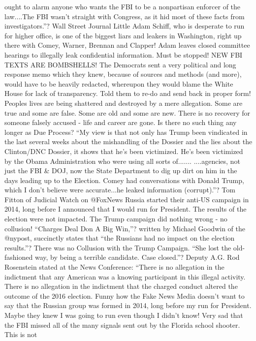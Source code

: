 ought to alarm anyone who wants the FBI to be a nonpartisan enforcer of
the law....The FBI wasn't straight with Congress, as it hid most of
these facts from investigators.''? Wall Street Journal Little Adam
Schiff, who is desperate to run for higher office, is one of the biggest
liars and leakers in Washington, right up there with Comey, Warner,
Brennan and Clapper! Adam leaves closed committee hearings to illegally
leak confidential information. Must be stopped! NEW FBI TEXTS ARE
BOMBSHELLS! The Democrats sent a very political and long response memo
which they knew, because of sources and methods (and more), would have
to be heavily redacted, whereupon they would blame the White House for
lack of transparency. Told them to re-do and send back in proper form!
Peoples lives are being shattered and destroyed by a mere allegation.
Some are true and some are false. Some are old and some are new. There
is no recovery for someone falsely accused - life and career are gone.
Is there no such thing any longer as Due Process? ``My view is that not
only has Trump been vindicated in the last several weeks about the
mishandling of the Dossier and the lies about the Clinton/DNC Dossier,
it shows that he's been victimized. He's been victimized by the Obama
Administration who were using all sorts of....... ....agencies, not just
the FBI \& DOJ, now the State Department to dig up dirt on him in the
days leading up to the Election. Comey had conversations with Donald
Trump, which I don't believe were accurate...he leaked information
(corrupt).''? Tom Fitton of Judicial Watch on @FoxNews Russia started
their anti-US campaign in 2014, long before I announced that I would run
for President. The results of the election were not impacted. The Trump
campaign did nothing wrong - no collusion! ``Charges Deal Don A Big
Win,''? written by Michael Goodwin of the @nypost, succinctly states
that ``the Russians had no impact on the election results.''? There was
no Collusion with the Trump Campaign. ``She lost the old-fashioned way,
by being a terrible candidate. Case closed.''? Deputy A.G. Rod
Rosenstein stated at the News Conference: ``There is no allegation in
the indictment that any American was a knowing participant in this
illegal activity. There is no allegation in the indictment that the
charged conduct altered the outcome of the 2016 election. Funny how the
Fake News Media doesn't want to say that the Russian group was formed in
2014, long before my run for President. Maybe they knew I was going to
run even though I didn't know! Very sad that the FBI missed all of the
many signals sent out by the Florida school shooter. This is not
